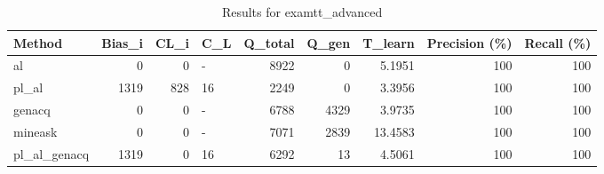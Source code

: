 \begin{table}[ht]
\caption{Results for examtt_advanced}
\begin{tabular}{lrrlrrrrr}
\hline
 Method       &   Bias\_i &   CL\_i & C\_L   &   Q\_total &   Q\_gen &   T\_learn &   Precision (\%) &   Recall (\%) \\
\hline
 al           &        0 &      0 & -     &      8922 &       0 &    5.1951 &             100 &          100 \\
 pl\_al        &     1319 &    828 & 16    &      2249 &       0 &    3.3956 &             100 &          100 \\
 genacq       &        0 &      0 & -     &      6788 &    4329 &    3.9735 &             100 &          100 \\
 mineask      &        0 &      0 & -     &      7071 &    2839 &   13.4583 &             100 &          100 \\
 pl\_al\_genacq &     1319 &      0 & 16    &      6292 &      13 &    4.5061 &             100 &          100 \\
\hline
\end{tabular}
\end{table}